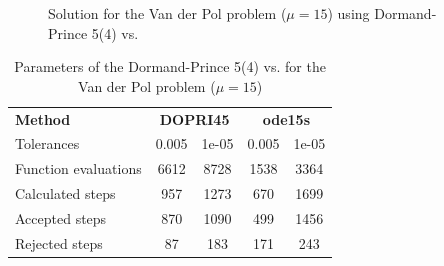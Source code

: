 \begin{figure}[H]
    \centering
    \caption{Solution for the Van der Pol problem ($\mathit{\mu = 15}$) using Dormand-Prince 5(4) vs. }
    \label{7_6_mu_15}
\end{figure}

\begin{table}[H]
    \centering
    \begin{tabular}{@{}l|cc|cc@{}}
    \toprule
    \textbf{Method}      & \multicolumn{2}{c|}{\textbf{DOPRI45}} & \multicolumn{2}{c}{\textbf{ode15s}} \\
    Tolerances           & 0.005             & 1e-05             & 0.005            & 1e-05            \\ \midrule
    Function evaluations & 6612              & 8728              & 1538             & 3364             \\
    Calculated steps     & 957               & 1273              & 670              & 1699             \\
    Accepted steps       & 870               & 1090              & 499              & 1456             \\
    Rejected steps       & 87                & 183               & 171              & 243              \\ \bottomrule
    \end{tabular}
    \caption{Parameters of the Dormand-Prince 5(4) vs.  for the Van der Pol problem ($\mathit{\mu = 15}$)}
    \label{7_6_adaptive_mu_15_table}
\end{table}

